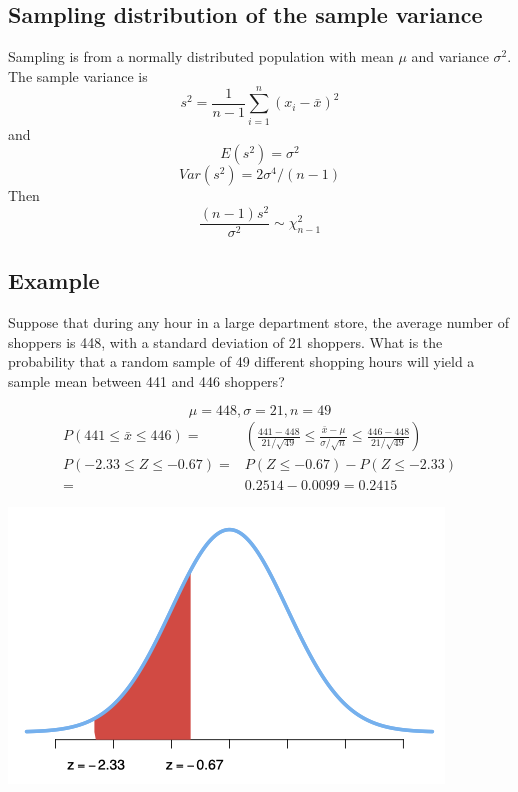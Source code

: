 \documentclass[
]{article}
\begin{document}
\hypertarget{sampling-distribution-of-the-sample-variance}{%
\subsection{Sampling distribution of the sample
variance}\label{sampling-distribution-of-the-sample-variance}}

Sampling is from a normally distributed population with mean \(\mu\) and
variance \(\sigma^2\). The sample variance is
\[s^2=\frac{1}{n-1}\sum_{i=1}^{n} (x_i-\bar{x})^2\] and
\[E(s^2)=\sigma^2\] \[Var(s^2)= 2\sigma^4/(n-1)\] Then
\[\frac{(n-1)s^2}{\sigma^2}\sim \chi^2_{n-1}\]

\hypertarget{example-1}{%
\subsection{Example}\label{example-1}}

Suppose that during any hour in a large department store, the average
number of shoppers is 448, with a standard deviation of 21 shoppers.
What is the probability that a random sample of 49 different shopping
hours will yield a sample mean between 441 and 446 shoppers?

\[\mu =448, \sigma=21, n=49\] \begin{align*}
P(441\leq \bar{x} \leq 446)=&\left(
\frac{441-448}{21/\sqrt{49}}\leq \frac{\bar{x}-\mu}{\sigma/\sqrt{n}}\leq \frac{446-448}{21/\sqrt{49}}\right)\\
P(-2.33 \leq Z \leq -0.67)=&P(Z \leq -0.67)-P(Z \leq -2.33)\\
=&0.2514-0.0099=0.2415 
\end{align*}

\begin{center}\includegraphics[width=0.8\linewidth,height=0.8\textheight]{ex.sampling} \end{center}
\end{document}
